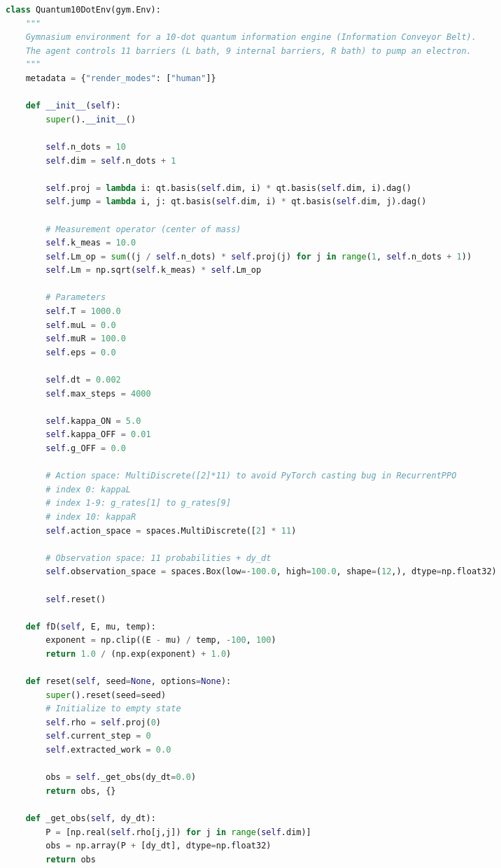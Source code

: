 \documentclass[a4paper,11pt,twocolumn]{article}
\begin{document}
\begin{CJK*}{UTF8}{min}
\begin{lstlisting}[language=Python]
class Quantum10DotEnv(gym.Env):
    """
    Gymnasium environment for a 10-dot quantum information engine (Information Conveyor Belt).
    The agent controls 11 barriers (L bath, 9 internal barriers, R bath) to pump an electron.
    """
    metadata = {"render_modes": ["human"]}

    def __init__(self):
        super().__init__()
        
        self.n_dots = 10
        self.dim = self.n_dots + 1
        
        self.proj = lambda i: qt.basis(self.dim, i) * qt.basis(self.dim, i).dag()
        self.jump = lambda i, j: qt.basis(self.dim, i) * qt.basis(self.dim, j).dag()
        
        # Measurement operator (center of mass)
        self.k_meas = 10.0
        self.Lm_op = sum((j / self.n_dots) * self.proj(j) for j in range(1, self.n_dots + 1))
        self.Lm = np.sqrt(self.k_meas) * self.Lm_op
        
        # Parameters
        self.T = 1000.0
        self.muL = 0.0
        self.muR = 100.0 
        self.eps = 0.0
        
        self.dt = 0.002
        self.max_steps = 4000
        
        self.kappa_ON = 5.0
        self.kappa_OFF = 0.01
        self.g_OFF = 0.0
        
        # Action space: MultiDiscrete([2]*11) to avoid PyTorch casting bug in RecurrentPPO
        # index 0: kappaL
        # index 1-9: g_rates[1] to g_rates[9]
        # index 10: kappaR
        self.action_space = spaces.MultiDiscrete([2] * 11)
        
        # Observation space: 11 probabilities + dy_dt
        self.observation_space = spaces.Box(low=-100.0, high=100.0, shape=(12,), dtype=np.float32)
        
        self.reset()
        
    def fD(self, E, mu, temp):
        exponent = np.clip((E - mu) / temp, -100, 100)
        return 1.0 / (np.exp(exponent) + 1.0)

    def reset(self, seed=None, options=None):
        super().reset(seed=seed)
        # Initialize to empty state
        self.rho = self.proj(0)
        self.current_step = 0
        self.extracted_work = 0.0
        
        obs = self._get_obs(dy_dt=0.0)
        return obs, {}

    def _get_obs(self, dy_dt):
        P = [np.real(self.rho[j,j]) for j in range(self.dim)]
        obs = np.array(P + [dy_dt], dtype=np.float32)
        return obs


\end{lstlisting}
\end{CJK*}
\end{document}
